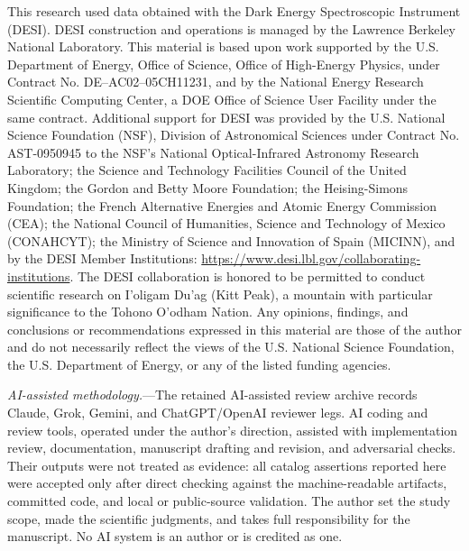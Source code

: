 \documentclass[twocolumn,linenumbers]{aastex702}
\begin{document}
\begin{acknowledgments}
This research used data obtained with the Dark Energy Spectroscopic Instrument (DESI).  DESI
construction and operations is managed by the Lawrence Berkeley National Laboratory.  This
material is based upon work supported by the U.S. Department of Energy, Office of Science,
Office of High-Energy Physics, under Contract No. DE--AC02--05CH11231, and by the National Energy
Research Scientific Computing Center, a DOE Office of Science User Facility under the same
contract.  Additional support for DESI was provided by the U.S. National Science Foundation
(NSF), Division of Astronomical Sciences under Contract No. AST-0950945 to the NSF's National
Optical-Infrared Astronomy Research Laboratory; the Science and Technology Facilities Council
of the United Kingdom; the Gordon and Betty Moore Foundation; the Heising-Simons Foundation;
the French Alternative Energies and Atomic Energy Commission (CEA); the National Council of
Humanities, Science and Technology of Mexico (CONAHCYT); the Ministry of Science and Innovation
of Spain (MICINN), and by the DESI Member Institutions:
\url{https://www.desi.lbl.gov/collaborating-institutions}.  The DESI collaboration is honored to
be permitted to conduct scientific research on I'oligam Du'ag (Kitt Peak), a mountain with
particular significance to the Tohono O'odham Nation.  Any opinions, findings, and conclusions
or recommendations expressed in this material are those of the author and do not necessarily
reflect the views of the U.S. National Science Foundation, the U.S. Department of Energy, or
any of the listed funding agencies.

\emph{AI-assisted methodology.}---The retained AI-assisted review archive records Claude, Grok, Gemini, and ChatGPT/OpenAI reviewer legs. AI coding and review tools, operated under the author's direction, assisted with implementation review, documentation, manuscript drafting and revision, and adversarial checks. Their outputs were not treated as evidence:
all catalog assertions reported here were accepted only after direct checking against
the machine-readable artifacts, committed code, and local or public-source validation.
The author set the study scope, made the scientific judgments, and takes full
responsibility for the manuscript.  No AI system is an author or is credited as one.
\end{acknowledgments}
\end{document}
